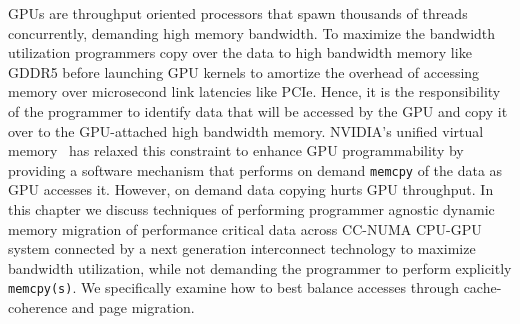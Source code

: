 %
GPUs are throughput oriented processors that spawn thousands of threads
concurrently, demanding high memory bandwidth. To maximize the bandwidth
utilization programmers copy over the data to high bandwidth memory like GDDR5
before launching GPU kernels to amortize the overhead of accessing memory over
microsecond link latencies like PCIe. Hence, it is the responsibility of the
programmer to identify data that will be accessed by the GPU and copy it over to
the GPU-attached high bandwidth memory. NVIDIA's unified virtual
memory~\cite{UVM} has relaxed this constraint to enhance GPU programmability by
providing a software mechanism that performs on demand {\tt memcpy} of the data
as GPU accesses it. However, on demand data copying hurts GPU throughput. In
this chapter we discuss techniques of performing programmer agnostic dynamic
memory migration of performance critical data across CC-NUMA CPU-GPU system
connected by a next generation interconnect technology to maximize bandwidth
utilization, while not demanding the programmer to perform explicitly {\tt
memcpy(s)}.  We specifically examine how to best balance accesses through
cache-coherence and page migration.



